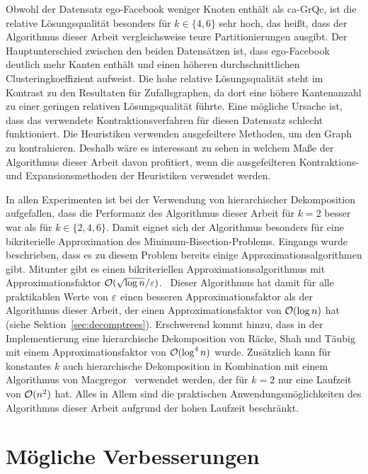 Obwohl der Datensatz ego-Facebook weniger Knoten enthält als ca-GrQc, ist die relative Lösungsqualität besonders für $k \in \{4,6\}$ sehr hoch, das heißt, dass der Algorithmus dieser Arbeit vergleichsweise teure Partitionierungen ausgibt.
Der Hauptunterschied zwischen den beiden Datensätzen ist, dass ego-Facebook deutlich mehr Kanten enthält und einen höheren durchschnittlichen Clusteringkoeffizient aufweist.
Die hohe relative Lösungsqualität steht im Kontrast zu den Resultaten für Zufallsgraphen, da dort eine höhere Kantenanzahl zu einer geringen relativen Lösungsqualität führte.
Eine mögliche Ursache ist, dass das verwendete Kontraktionsverfahren für diesen Datensatz schlecht funktioniert.
Die Heuristiken verwenden ausgefeiltere Methoden, um den Graph zu kontrahieren.
Deshalb wäre es interessant zu sehen in welchem Maße der Algorithmus dieser Arbeit davon profitiert, wenn die ausgefeilteren Kontraktions- und Expansionsmethoden der Heuristiken verwendet werden.

In allen Experimenten ist bei der Verwendung von hierarchischer Dekomposition aufgefallen, dass die Performanz des Algorithmus dieser Arbeit für $k=2$ besser war als für $k \in \{2, 4, 6\}$.
Damit eignet sich der Algorithmus besonders für eine bikriterielle Approximation des Minimum-Bisection-Problems.
Eingangs wurde beschrieben, dass es zu diesem Problem bereits einige Approximationsalgorithmen gibt.
Mitunter gibt es einen bikriteriellen Approximationsalgorithmus mit Approximationsfaktor $\mathcal{O}(\sqrt{\log n}/\varepsilon)$.~\cite{LR99, ARV09}
Dieser Algorithmus hat damit für alle praktikablen Werte von $\varepsilon$ einen besseren Approximationsfaktor als der Algorithmus dieser Arbeit, der einen Approximationsfaktor von $\mathcal{O}(\log n)$ hat (siehe Sektion~\ref{sec:decomptrees}).
Erschwerend kommt hinzu, dass in der Implementierung eine hierarchische Dekomposition von Räcke, Shah und Täubig~\cite{RST14} mit einem Approximationsfaktor von $\mathcal{O}(\log^4 n)$ wurde. 
Zusätzlich kann für konstantes $k$ auch hierarchische Dekomposition in Kombination mit einem Algorithmus von Macgregor~\cite{mcg78} verwendet werden, der für $k=2$ nur eine Laufzeit von $\mathcal{O}(n^2)$ hat.
Alles in Allem sind die praktischen Anwendungsmöglichkeiten des Algorithmus dieser Arbeit aufgrund der hohen Laufzeit beschränkt.

\section{Mögliche Verbesserungen}


